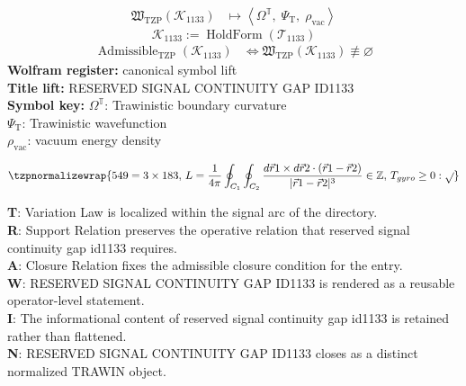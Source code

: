 \noindent
\begin{minipage}[t]{0.48\linewidth}
\begingroup
\small
\[
\begin{aligned}
\mathfrak{W}_{\mathrm{TZP}}\!\left(\mathcal{K}_{1133}\right)
&\longmapsto
\left\langle \Omega^{\mathbb{T}},\; \Psi_{\mathrm{T}},\; \rho_{\mathrm{vac}} \right\rangle
\end{aligned}
\]
\[
\mathcal{K}_{1133}
:=
\operatorname{HoldForm}\!\left(\mathcal{T}_{1133}\right)
\]
\[
\begin{aligned}
\operatorname{Admissible}_{\mathrm{TZP}}\!\left(\mathcal{K}_{1133}\right)
&\Longleftrightarrow
\mathfrak{W}_{\mathrm{TZP}}\!\left(\mathcal{K}_{1133}\right)\not\equiv\varnothing
\end{aligned}
\]
\textbf{Wolfram register:} canonical symbol lift\\
\textbf{Title lift:} RESERVED SIGNAL CONTINUITY GAP ID1133\\
\textbf{Symbol key:} \(\Omega^{\mathbb{T}}\): Trawinistic boundary curvature\\ \(\Psi_{\mathrm{T}}\): Trawinistic wavefunction\\ \(\rho_{\mathrm{vac}}\): vacuum energy density
\par
\endgroup
\end{minipage}\hfill
\begin{minipage}[t]{0.48\linewidth}
\[
\tzpnormalizewrap{549=3\times183,\,L = \frac{1}{4\pi}\oint_{C_{1}}\oint_{C_{2}}\frac{d\vec{r} {1}\times d\vec{r} {2}\cdot(\vec{r} {1}-\vec{r} {2})}{|\vec{r} {1}-\vec{r} {2}|^{3}} \in \mathbb{Z},\,T_{gyro}\ge0:\sqrt{}}
\]

\small
\textbf{T}: Variation Law is localized within the signal arc of the directory.\\
\textbf{R}: Support Relation preserves the operative relation that reserved signal continuity gap id1133 requires.\\
\textbf{A}: Closure Relation fixes the admissible closure condition for the entry.\\
\textbf{W}: RESERVED SIGNAL CONTINUITY GAP ID1133 is rendered as a reusable operator-level statement.\\
\textbf{I}: The informational content of reserved signal continuity gap id1133 is retained rather than flattened.\\
\textbf{N}: RESERVED SIGNAL CONTINUITY GAP ID1133 closes as a distinct normalized TRAWIN object.
\normalsize
\end{minipage}

